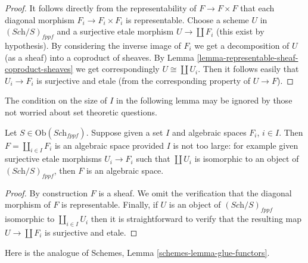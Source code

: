 \begin{proof}
It follows directly from the representability of
$F \to F \times F$ that each diagonal morphism
$F_i \to F_i \times F_i$ is representable.
Choose a scheme $U$ in $(\textit{Sch}/S)_{fppf}$ and a surjective
etale morphism $U \to \coprod F_i$ (this exist by hypothesis).
By considering the inverse image of $F_i$ we get a decomposition
of $U$ (as a sheaf) into a coproduct of sheaves.
By Lemma \ref{lemma-representable-sheaf-coproduct-sheaves}
we get correspondingly $U \cong \coprod U_i$.
Then it follows easily that $U_i \to F_i$ is surjective
and etale (from the corresponding property of $U \to F$).
\end{proof}

\noindent
The condition on the size of $I$ in the
following lemma may be ignored by those not worried about
set theoretic questions.

\begin{lemma}
\label{lemma-coproduct-algebraic-spaces}
Let $S \in \text{Ob}(\textit{Sch}_{fppf})$.
Suppose given a set $I$ and algebraic spaces $F_i$, $i \in I$.
Then $F = \coprod_{i \in I} F_i$ is an algebraic space
provided $I$ is not too large: for example given
surjective etale morphisms $U_i \to F_i$ such that
$\coprod U_i$ is isomorphic to an object of $(\textit{Sch}/S)_{fppf}$,
then $F$ is an algebraic space.
\end{lemma}

\begin{proof}
By construction $F$ is a sheaf. We omit the verification that the
diagonal morphism of $F$ is representable. Finally, if $U$ is an
object of $(\textit{Sch}/S)_{fppf}$ isomorphic to $\coprod_{i \in I} U_i$
then it is straightforward to verify that the resulting map
$U \to \coprod F_i$ is surjective and etale.
\end{proof}

\noindent
Here is the analogue of Schemes, Lemma \ref{schemes-lemma-glue-functors}.

